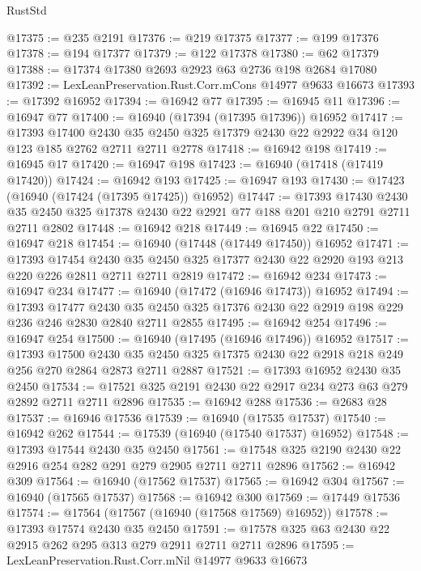 \begin{lexlean}{RustStd}
\begin{coremodule}
@17375 := @235 @2191
@17376 := @219 @17375
@17377 := @199 @17376
@17378 := @194 @17377
@17379 := @122 @17378
@17380 := @62 @17379
@17388 := @17374 @17380 @2693 @2923 @63 @2736 @198 @2684 @17080
@17392 := LexLeanPreservation.Rust.Corr.mCons @14977 @9633 @16673
@17393 := @17392 @16952
@17394 := @16942 @77
@17395 := @16945 @11
@17396 := @16947 @77
@17400 := @16940 (@17394 (@17395 @17396)) @16952
@17417 := @17393
    @17400
    @2430
    @35
    @2450
    @325
    @17379
    @2430
    @22
    @2922
    @34
    @120
    @123
    @185
    @2762
    @2711
    @2711
    @2778
@17418 := @16942 @198
@17419 := @16945 @17
@17420 := @16947 @198
@17423 := @16940 (@17418 (@17419 @17420))
@17424 := @16942 @193
@17425 := @16947 @193
@17430 := @17423 (@16940 (@17424 (@17395 @17425)) @16952)
@17447 := @17393
    @17430
    @2430
    @35
    @2450
    @325
    @17378
    @2430
    @22
    @2921
    @77
    @188
    @201
    @210
    @2791
    @2711
    @2711
    @2802
@17448 := @16942 @218
@17449 := @16945 @22
@17450 := @16947 @218
@17454 := @16940 (@17448 (@17449 @17450)) @16952
@17471 := @17393
    @17454
    @2430
    @35
    @2450
    @325
    @17377
    @2430
    @22
    @2920
    @193
    @213
    @220
    @226
    @2811
    @2711
    @2711
    @2819
@17472 := @16942 @234
@17473 := @16947 @234
@17477 := @16940 (@17472 (@16946 @17473)) @16952
@17494 := @17393
    @17477
    @2430
    @35
    @2450
    @325
    @17376
    @2430
    @22
    @2919
    @198
    @229
    @236
    @246
    @2830
    @2840
    @2711
    @2855
@17495 := @16942 @254
@17496 := @16947 @254
@17500 := @16940 (@17495 (@16946 @17496)) @16952
@17517 := @17393
    @17500
    @2430
    @35
    @2450
    @325
    @17375
    @2430
    @22
    @2918
    @218
    @249
    @256
    @270
    @2864
    @2873
    @2711
    @2887
@17521 := @17393 @16952 @2430 @35 @2450
@17534 := @17521 @325 @2191 @2430 @22 @2917 @234 @273 @63 @279 @2892 @2711 @2711 @2896
@17535 := @16942 @288
@17536 := @2683 @28
@17537 := @16946 @17536
@17539 := @16940 (@17535 @17537)
@17540 := @16942 @262
@17544 := @17539 (@16940 (@17540 @17537) @16952)
@17548 := @17393 @17544 @2430 @35 @2450
@17561 := @17548 @325 @2190 @2430 @22 @2916 @254 @282 @291 @279 @2905 @2711 @2711 @2896
@17562 := @16942 @309
@17564 := @16940 (@17562 @17537)
@17565 := @16942 @304
@17567 := @16940 (@17565 @17537)
@17568 := @16942 @300
@17569 := @17449 @17536
@17574 := @17564 (@17567 (@16940 (@17568 @17569) @16952))
@17578 := @17393 @17574 @2430 @35 @2450
@17591 := @17578 @325 @63 @2430 @22 @2915 @262 @295 @313 @279 @2911 @2711 @2711 @2896
@17595 := LexLeanPreservation.Rust.Corr.mNil @14977 @9633 @16673

\end{coremodule}
\end{lexlean}
